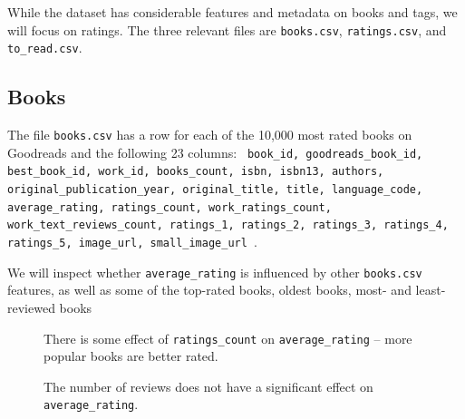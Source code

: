 \documentclass[11pt]{article}
\begin{document}
   While the dataset has considerable features and metadata on books and tags, we will focus on ratings. The three relevant files are \texttt{books.csv}, \texttt{ratings.csv}, and \texttt{to\_read.csv}.
   
   
   
   
    \hypertarget{books}{%
\subsection{Books}\label{books}}



The file \texttt{books.csv} has a row for each of the 10,000 most rated books on Goodreads and the following 23 columns:
\texttt{
book\_id,
goodreads\_book\_id,
best\_book\_id,
work\_id,          
books\_count,  
isbn,                 
isbn13,             
authors,            
original\_publication\_year,
original\_title,               
title,                        
language\_code,    
average\_rating,     
ratings\_count,       
work\_ratings\_count,
work\_text\_reviews\_count,
ratings\_1,
ratings\_2,
ratings\_3,
ratings\_4,
ratings\_5,
image\_url,
small\_image\_url
}.

We will inspect whether \texttt{average\_rating} is influenced by
other \texttt{books.csv} features, as well as some of the top-rated books, oldest books, most- and least-reviewed books
        
    
\begin{figure}
   \begin{center}
    \end{center}
\caption[Average Rating by Ratings Count]{There is some effect of \texttt{ratings\_count} on
\texttt{average\_rating} -- more popular books are better rated.
     \label{fig:average-rating-ratings-count}
}
\end{figure}    
    
    

\begin{figure}
    \begin{center}
    \end{center}
\caption[Average Rating by Reviews Count]{The number of reviews does not have a significant effect on
\texttt{average\_rating}.}
     \label{fig:average-rating-reviews-count}
\end{figure}
\end{document}

